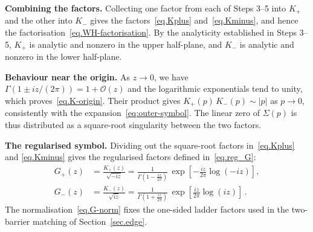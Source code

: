 \documentclass[11pt,a4paper]{article}
\theoremstyle{definition}
\begin{document}
\medskip
\noindent\textbf{Combining the factors.}
Collecting one factor from each of Steps 3--5 into $K_+$ and the other
into $K_-$ gives the factors~\eqref{eq.Kplus} and~\eqref{eq.Kminus}, and hence
the factorisation~\eqref{eq.WH-factorisation}.
By the analyticity established in Steps 3--5, $K_+$ is analytic and nonzero
in the upper half-plane, and $K_-$ is analytic and nonzero in the lower
half-plane.


\medskip
\noindent\textbf{Behaviour near the origin.}
As $z \to 0$, we have $\Gamma(1 \pm iz/(2\pi)) = 1 + \mathcal{O}(z)$ and
the logarithmic exponentials tend to unity, which proves~\eqref{eq.K-origin}.
Their product gives $K_+(p)\,K_-(p) \sim |p|$ as $p \to 0$, consistently
with the expansion~\eqref{eq:outer-symbol}.
The linear zero of $\Sigma(p)$ is thus distributed as a square-root singularity
between the two factors.

\medskip
\noindent\textbf{The regularised symbol.}
Dividing out the square-root factors in~\eqref{eq.Kplus} and
\eqref{eq.Kminus} gives the regularised factors defined in~\eqref{eq.reg_G}:
\begin{equation}
\begin{aligned}
  G_+(z) &= \frac{K_+(z)}{\sqrt{-iz}}
  = \frac{1}{\Gamma \left(1 - \frac{iz}{2\pi}\right)}\,
    \exp \left[-\frac{iz}{2\pi}\log(-iz)\right], \\
  G_-(z) &= \frac{K_-(z)}{\sqrt{iz}} = \frac{1}{\Gamma \left(1 + \frac{iz}{2\pi}\right)}\,
  \exp \left[\frac{iz}{2\pi}\log(iz)\right] \,.
\end{aligned}
\end{equation}
The normalisation~\eqref{eq.G-norm} fixes the one-sided ladder factors used in
the two-barrier matching of Section~\ref{sec.edge}.
\end{document}

